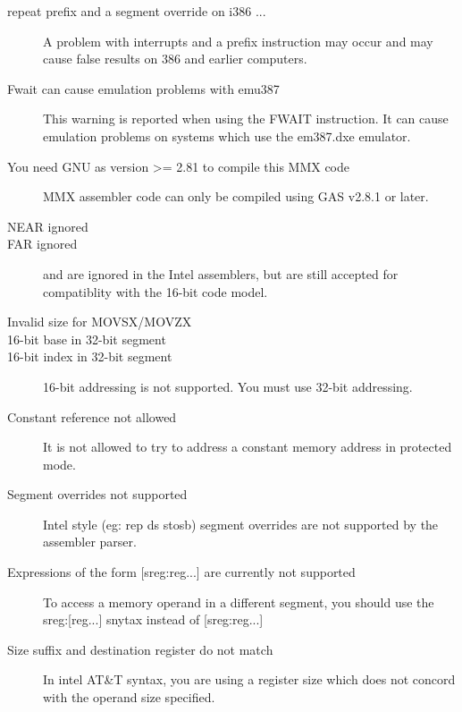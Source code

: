 \begin{description}
\item [repeat prefix and a segment override on \var{<=} i386 ...]
A problem with interrupts and a prefix instruction may occur and may cause
false results on 386 and earlier computers.

\item [Fwait can cause emulation problems with emu387]
This warning is reported when using the FWAIT instruction. It can
cause emulation problems on systems which use the em387.dxe emulator.

\item [You need GNU as version >= 2.81 to compile this MMX code]
MMX assembler code can only be compiled using GAS v2.8.1 or later.

\item [NEAR ignored]
\item [FAR ignored]
\label{FarIgnored}
 and  are ignored in the Intel assemblers, but 
are still accepted for compatiblity with the 16-bit code model.

\item [Invalid size for MOVSX/MOVZX]

\item [16-bit base in 32-bit segment]
\item [16-bit index in 32-bit segment]
16-bit addressing is not supported. You must use 32-bit addressing.


\item [Constant reference not allowed]
It is not allowed to try to address a constant memory address in protected
mode.

\item [Segment overrides not supported]
Intel style (eg: rep ds stosb) segment overrides are not supported by
the assembler parser.

\item [{Expressions of the form [sreg:reg...] are currently not supported}]
To access a memory operand in a different segment, you should use the
sreg:[reg...] snytax instead of [sreg:reg...]

\item [Size suffix and destination register do not match]
In intel AT\&T syntax, you are using a register size which does
not concord with the operand size specified.


\end{description}
